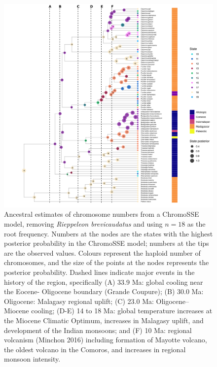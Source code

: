 \documentclass[a4paper, 12pt]{article}
\begin{document}
\newpage
\begin{figure}[H]
 \centering
  \includegraphics[width = \linewidth]{figures/biogeography-figure.png}
  \caption{Ancestral estimates of chromosome numbers from a ChromoSSE model, removing \textit{Rieppeleon brevicaudatus} and using $n = 18$ as the root frequency. Numbers at the nodes are the states with the highest posterior probability in the ChromoSSE model; numbers at the tips are the observed values. Colours represent the haploid number of chromosomes, and the size of the points at the nodes represents the posterior probability. Dashed lines indicate major events in the history of the region, specifically (A) 33.9 Ma: global cooling near the Eocene- Oligocene boundary (Grande Coupure); (B) 30.0 Ma: Oligocene: Malagasy regional uplift; (C) 23.0 Ma: Oligocene–Miocene cooling; (D-E) 14 to 18 Ma: global temperature increases at the Miocene Climatic Optimum, increases in Malagasy uplift, and development of the Indian monsoons; and (F) 10 Ma: regional volcanism (Minchon 2016) including formation of Mayotte volcano, the oldest volcano in the Comoros, and increases in regional monsoon intensity.
}
  \label{fig-biogeography}
\end{figure} 


\newpage
\end{document}
